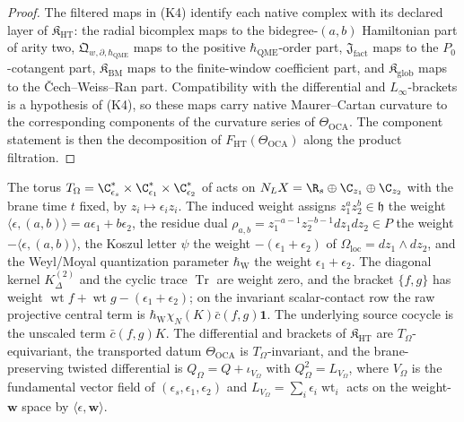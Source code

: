\begin{proof}
The filtered maps in \textup{(K4)} identify each native complex with its
declared layer of \(\mathfrak K_{\mathrm{HT}}\): the radial bicomplex
maps to the bidegree-\((a,b)\) Hamiltonian part of arity two,
\(\mathfrak Q_{w,\partial,\hbar_{\mathrm{QME}}}\) maps to the positive
\(\hbar_{\mathrm{QME}}\)-order part, \(\mathfrak J_{\mathrm{fact}}\) maps to the \(P_0\)-cotangent
part, \(\mathfrak K_{\mathrm{BM}}\) maps to the finite-window coefficient
part, and \(\mathfrak K_{\mathrm{glob}}\) maps to the
\v Cech--Weiss--Ran part.  Compatibility with the differential and
\(L_\infty\)-brackets is a hypothesis of \textup{(K4)}, so these maps
carry native Maurer--Cartan curvature to the corresponding components of
the curvature series of \(\Theta_{\mathrm{OCA}}\).  The component
statement is then the decomposition of
\(F_{\mathrm{HT}}(\Theta_{\mathrm{OCA}})\) along the product filtration.
\end{proof}

\begin{defn}\label{defn:omega-grading}
The torus
\(T_\Omega=\C^*_{\epsilon_s}\times\C^*_{\epsilon_1}\times\C^*_{\epsilon_2}\)
of  acts on
\(N_LX=\R_s\oplus\C_{z_1}\oplus\C_{z_2}\) with the brane time \(t\)
fixed, by \(z_i\mapsto\epsilon_i z_i\).  The induced weight assigns
\(z_1^az_2^b\in\mathfrak h\) the weight
\(\langle\epsilon,(a,b)\rangle=a\epsilon_1+b\epsilon_2\), the residue
dual \(\rho_{a,b}=z_1^{-a-1}z_2^{-b-1}dz_1dz_2\in P\) the weight
\(-\langle\epsilon,(a,b)\rangle\), the Koszul letter \(\psi\) the weight
\(-(\epsilon_1+\epsilon_2)\) of \(\Omega_{\mathrm{loc}}=dz_1\wedge dz_2\),
and the Weyl/Moyal quantization parameter \(\hbar_{\mathrm{W}}\) the weight
\(\epsilon_1+\epsilon_2\).  The diagonal kernel \(K^{(2)}_\Delta\) and
the cyclic trace \(\operatorname{Tr}\) are weight zero, and the bracket
\(\{f,g\}\) has weight
\(\operatorname{wt}f+\operatorname{wt}g-(\epsilon_1+\epsilon_2)\); on
the invariant scalar-contact row the raw projective central term is
\(\hbar_{\mathrm{W}}\chi_N(K)\bar c(f,g)\mathbf 1\).  The underlying
source cocycle is the unscaled term \(\bar c(f,g)K\).
The differential and brackets of \(\mathfrak K_{\mathrm{HT}}\) are
\(T_\Omega\)-equivariant, the transported datum \(\Theta_{\mathrm{OCA}}\)
is \(T_\Omega\)-invariant, and the brane-preserving twisted
differential is \(Q_\Omega=Q+\iota_{V_\Omega}\) with
\(Q_\Omega^2=L_{V_\Omega}\), where \(V_\Omega\) is the fundamental
vector field of \((\epsilon_s,\epsilon_1,\epsilon_2)\) and
\(L_{V_\Omega}=\sum_i\epsilon_i\operatorname{wt}_i\) acts on the
weight-\(\mathbf w\) space by \(\langle\epsilon,\mathbf w\rangle\).
\end{defn}

